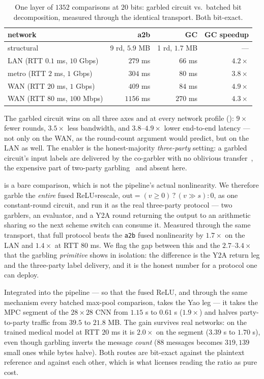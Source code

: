 \documentclass[11pt]{article}
\theoremstyle{plain}
\theoremstyle{definition}
\theoremstyle{remark}
\begin{document}
\begin{table}[t]
\centering
\caption{One layer of $1352$ comparisons at $20$ bits: garbled circuit vs.\
batched bit decomposition, measured through the identical transport. Both
bit-exact.}
\label{tab:gc}
\begin{tabular}{@{}lrrr@{}}
\toprule
network & a2b & GC & GC speedup \\
\midrule
structural & 9 rd, $5.9$ MB & 1 rd, $1.7$ MB & --- \\
LAN (RTT $0.1$ ms, $10$ Gbps) & $279$ ms & $66$ ms & $4.2\times$ \\
metro (RTT $2$ ms, $1$ Gbps) & $304$ ms & $80$ ms & $3.8\times$ \\
WAN (RTT $20$ ms, $1$ Gbps) & $409$ ms & $84$ ms & $4.9\times$ \\
WAN (RTT $80$ ms, $100$ Mbps) & $1156$ ms & $270$ ms & $4.3\times$ \\
\bottomrule
\end{tabular}
\end{table}

The garbled circuit wins on all three axes and at every network profile
(\Cref{tab:gc}): $9\times$ fewer rounds, $3.5\times$ less bandwidth, and
$3.8$--$4.9\times$ lower end-to-end latency --- not only on the WAN, as the
round-count argument would predict, but on the LAN as well. The enabler is
the honest-majority \emph{three-party} setting: a garbled circuit's input
labels are delivered by the co-garbler with no oblivious
transfer~\cite{ASTRA}, the expensive part of two-party garbling~\cite{Yao}
and absent here.

 is a bare comparison, which is not the pipeline's actual
nonlinearity. We therefore garble the \emph{entire} fused
ReLU$\circ$rescale, $\mathrm{out} = (v \geq 0)\,?\,(v \gg s):0$, as one
constant-round circuit, and run it as the real three-party protocol ---
two garblers, an evaluator, and a Y2A round returning the output to an
arithmetic sharing so the next scheme switch can consume it. Measured through
the same transport, that full protocol beats the \texttt{a2b} fused
nonlinearity by $1.7\times$ on the LAN and $1.4\times$ at RTT $80$ ms. We
flag the gap between this and the $2.7$--$3.4\times$ that the garbling
\emph{primitive} shows in isolation: the difference is the Y2A return leg and
the three-party label delivery, and it is the honest number for a protocol
one can deploy.

Integrated into the pipeline --- so that the fused ReLU, and through the same
mechanism every batched max-pool comparison, takes the Yao leg --- it takes
the MPC segment of the $28\times28$ CNN from $1.15$ s to $0.61$ s
($1.9\times$) and halves party-to-party traffic from $39.5$ to $21.8$ MB. The
gain survives real networks: on the trained medical model at RTT $20$ ms it
is $2.0\times$ on the segment ($3.39$ s to $1.70$ s), even though garbling
inverts the message \emph{count} ($88$ messages becomes $319{,}139$ small
ones while bytes halve). Both routes are bit-exact against the plaintext
reference and against each other, which is what licenses reading the ratio as
pure cost.
\end{document}
